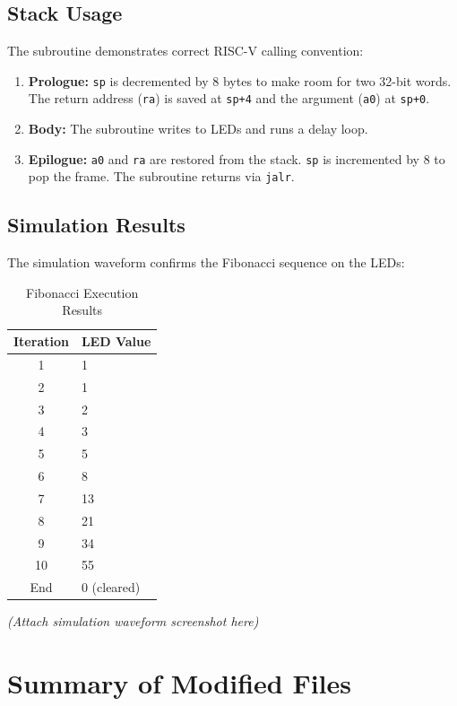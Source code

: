 \documentclass[12pt,a4paper]{article}
\begin{document}
\subsection{Stack Usage}
The subroutine demonstrates correct RISC-V calling convention:
\begin{enumerate}
    \item \textbf{Prologue:} \texttt{sp} is decremented by 8 bytes to make room for two 32-bit words. The return address (\texttt{ra}) is saved at \texttt{sp+4} and the argument (\texttt{a0}) at \texttt{sp+0}.
    \item \textbf{Body:} The subroutine writes to LEDs and runs a delay loop.
    \item \textbf{Epilogue:} \texttt{a0} and \texttt{ra} are restored from the stack. \texttt{sp} is incremented by 8 to pop the frame. The subroutine returns via \texttt{jalr}.
\end{enumerate}

\subsection{Simulation Results}
The simulation waveform confirms the Fibonacci sequence on the LEDs:

\begin{table}[h]
\centering
\caption{Fibonacci Execution Results}
\begin{tabular}{@{}cl@{}}
\toprule
\textbf{Iteration} & \textbf{LED Value} \\
\midrule
1  & 1  \\
2  & 1  \\
3  & 2  \\
4  & 3  \\
5  & 5  \\
6  & 8  \\
7  & 13 \\
8  & 21 \\
9  & 34 \\
10 & 55 \\
End & 0 (cleared) \\
\bottomrule
\end{tabular}
\end{table}

\textit{(Attach simulation waveform screenshot here)}

\section{Summary of Modified Files}
\end{document}
